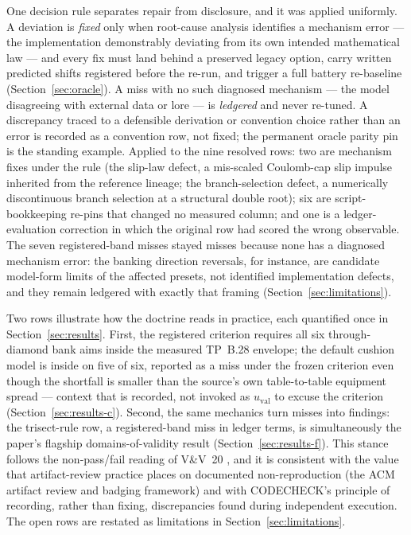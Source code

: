 One decision rule separates repair from disclosure, and it was applied
uniformly. A deviation is \emph{fixed} only when root-cause analysis
identifies a mechanism error --- the implementation demonstrably deviating
from its own intended mathematical law --- and every fix must land behind
a preserved legacy option, carry written predicted shifts registered
before the re-run, and trigger a full battery re-baseline
(Section~\ref{sec:oracle}). A miss with no such diagnosed mechanism ---
the model disagreeing with external data or lore --- is \emph{ledgered}
and never re-tuned. A discrepancy traced to a defensible derivation or
convention choice rather than an error is recorded as a convention row,
not fixed; the permanent oracle parity pin is the standing example. Applied to the
nine resolved rows: two are mechanism fixes under the rule
(the slip-law defect, a mis-scaled Coulomb-cap slip impulse inherited
from the reference lineage; the branch-selection defect, a
numerically discontinuous branch selection at a structural double root);
six are script-bookkeeping re-pins that changed no measured column; and one is a
ledger-evaluation correction in which the original row had scored the
wrong observable. The seven
registered-band misses stayed misses because none has a diagnosed
mechanism error: the banking direction reversals, for instance, are
candidate model-form limits of the affected presets, not identified
implementation defects, and they remain ledgered with exactly that
framing (Section~\ref{sec:limitations}).

Two rows illustrate how the doctrine reads in practice, each quantified
once in Section~\ref{sec:results}. First, the registered 
criterion requires all six through-diamond bank aims inside the measured
TP~B.28 envelope; the default cushion model is inside on five of six,
reported as a miss under the frozen criterion even though the shortfall
is smaller than the source's own table-to-table equipment spread ---
context that is recorded, not invoked as $u_{\mathrm{val}}$ to excuse
the criterion (Section~\ref{sec:results-c}). Second, the same mechanics turn misses
into findings: the trisect-rule row, a
registered-band miss in ledger terms, is simultaneously the paper's
flagship domains-of-validity result
(Section~\ref{sec:results-f}). This stance follows the
non-pass/fail reading of V\&V~20 \citep{asme2009vv20}, and it is consistent
with the value that artifact-review practice places on documented
non-reproduction (the ACM artifact review and badging framework) and with
CODECHECK's principle of recording, rather than fixing, discrepancies found
during independent execution. The open rows are restated as limitations in
Section~\ref{sec:limitations}.

